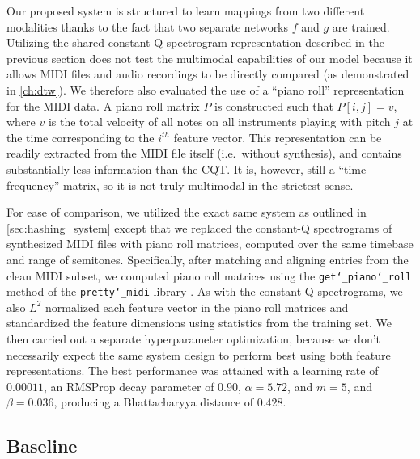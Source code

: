 Our proposed system is structured to learn mappings from two different modalities thanks to the fact that two separate networks $f$ and $g$ are trained.
Utilizing the shared constant-Q spectrogram representation described in the previous section does not test the multimodal capabilities of our model because it allows MIDI files and audio recordings to be directly compared (as demonstrated in \cref{ch:dtw}).
We therefore also evaluated the use of a ``piano roll'' representation for the MIDI data.
A piano roll matrix $P$ is constructed such that $P[i, j] = v$, where $v$ is the total velocity of all notes on all instruments playing with pitch $j$ at the time corresponding to the $i^{th}$ feature vector.
This representation can be readily extracted from the MIDI file itself (i.e.\ without synthesis), and contains substantially less information than the CQT.
It is, however, still a ``time-frequency'' matrix, so it is not truly multimodal in the strictest sense.

For ease of comparison, we utilized the exact same system as outlined in \cref{sec:hashing_system} except that we replaced the constant-Q spectrograms of synthesized MIDI files with piano roll matrices, computed over the same timebase and range of semitones.
Specifically, after matching and aligning entries from the clean MIDI subset, we computed piano roll matrices using the \texttt{get\char`_piano\char`_roll} method of the \texttt{pretty\char`_midi} library \cite{raffel2014pretty_midi}.
As with the constant-Q spectrograms, we also $L^2$ normalized each feature vector in the piano roll matrices and standardized the feature dimensions using statistics from the training set.
We then carried out a separate hyperparameter optimization, because we don't necessarily expect the same system design to perform best using both feature representations.
The best performance was attained with a learning rate of $0.00011$, an RMSProp decay parameter of $0.90$, $\alpha = 5.72$, and $m = 5$, and $\beta = 0.036$, producing a Bhattacharyya distance of $0.428$.

\subsection{Baseline}
\label{sec:baseline}

